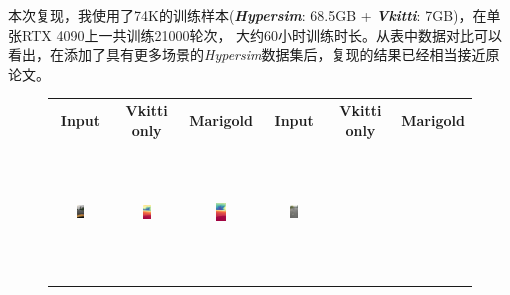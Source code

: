 \documentclass{article}
\begin{document}
本次复现，我使用了74K的训练样本(\textit{\textbf{Hypersim}}: 68.5GB + \textit{\textbf{Vkitti}}: 7GB)，在单张RTX 4090上一共训练21000轮次，
大约60小时训练时长。从表中数据对比可以看出，在添加了具有更多场景的\textit{Hypersim}数据集后，复现的结果已经相当接近原论文。

\begin{figure}[H]
  \centering
  \small %
  \setlength{\tabcolsep}{2pt} %
  \begin{tabular}{cccccc}
    \textbf{Input} & \textbf{Vkitti only} & \textbf{Marigold} & \textbf{Input} & \textbf{Vkitti only} & \textbf{Marigold} \\
    \includegraphics[width=0.15\textwidth,height=3.5cm,keepaspectratio]{images/on-the-road/1.jpg} &
    \includegraphics[width=0.15\textwidth,height=3.5cm,keepaspectratio]{images/real_image_trained/depth_colored/1.png} &
    \includegraphics[width=0.15\textwidth,height=3.5cm,keepaspectratio]{images/real_image/depth_colored/1.png} &
    \includegraphics[width=0.15\textwidth,height=3.5cm,keepaspectratio]{images/on-the-road/2.jpg} &

\end{tabular}
\end{figure}
\end{document}
